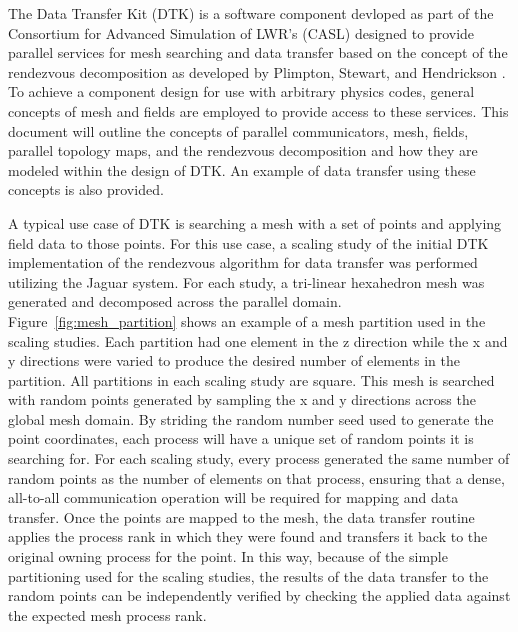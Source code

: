 \documentclass{mc2013}
\begin{document}
The Data Transfer Kit (DTK) is a software component devloped as part
of the Consortium for Advanced Simulation of LWR's (CASL) designed to
provide parallel services for mesh searching and data transfer based
on the concept of the rendezvous decomposition as developed by
Plimpton, Stewart, and Hendrickson \cite{Plimpton_2004}. To achieve a
component design for use with arbitrary physics codes, general
concepts of mesh and fields are employed to provide access to these
services. This document will outline the concepts of parallel
communicators, mesh, fields, parallel topology maps, and the
rendezvous decomposition and how they are modeled within the design of
DTK. An example of data transfer using these concepts is also
provided.


\label{sec:rendezvous_algorithms}

\label{sec:neutronics_cfd}

\label{sec:scaling_study}

A typical use case of DTK is searching a mesh with a set of points and
applying field data to those points. For this use case, a scaling
study of the initial DTK implementation of the rendezvous algorithm
for data transfer was performed utilizing the Jaguar system. For each
study, a tri-linear hexahedron mesh was generated and decomposed
across the parallel domain. Figure~\ref{fig:mesh_partition} shows an
example of a mesh partition used in the scaling studies. Each
partition had one element in the z direction while the x and y
directions were varied to produce the desired number of elements in
the partition. All partitions in each scaling study are square. This
mesh is searched with random points generated by sampling the x and y
directions across the global mesh domain.  By striding the random
number seed used to generate the point coordinates, each process will
have a unique set of random points it is searching for. For each
scaling study, every process generated the same number of random
points as the number of elements on that process, ensuring that a
dense, all-to-all communication operation will be required for mapping
and data transfer. Once the points are mapped to the mesh, the data
transfer routine applies the process rank in which they were found and
transfers it back to the original owning process for the point. In
this way, because of the simple partitioning used for the scaling
studies, the results of the data transfer to the random points can be
independently verified by checking the applied data against the
expected mesh process rank.
\end{document}
